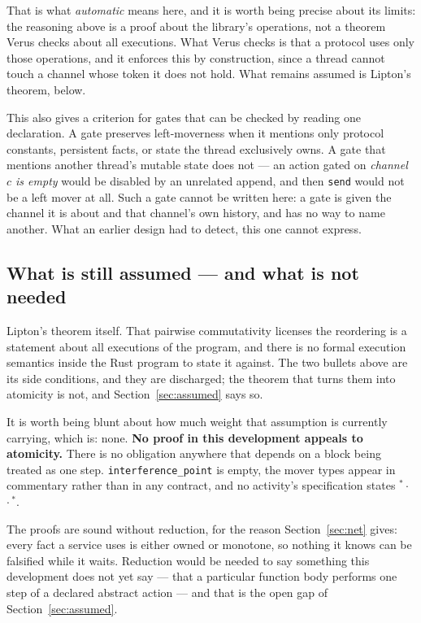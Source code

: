 \documentclass[11pt]{article}
\newcommand{\code}[1]{\texttt{#1}}
\newcommand{\chipR}[1]{\fcolorbox{rightmv}{white}{\color{rightmv}\ttfamily\scriptsize\vphantom{Ay}#1}}
\newcommand{\chipL}[1]{\fcolorbox{leftmv}{white}{\color{leftmv}\ttfamily\scriptsize\vphantom{Ay}#1}}
\newcommand{\chipN}[1]{\fcolorbox{neutralmv}{white}{\color{neutralmv}\ttfamily\scriptsize\vphantom{Ay}#1}}
\begin{document}
That is what \emph{automatic} means here, and it is worth being precise about
its limits: the reasoning above is a proof about the library's operations, not a
theorem Verus checks about all executions. What Verus checks is that a protocol
uses only those operations, and it enforces this by construction, since a thread
cannot touch a channel whose token it does not hold. What remains assumed is
Lipton's theorem, below.

This also gives a criterion for gates that can be checked by reading one
declaration. A gate preserves left-moverness when it mentions only protocol
constants, persistent facts, or state the thread exclusively owns. A gate that
mentions another thread's mutable state does not --- an action gated on
\emph{channel $c$ is empty} would be disabled by an unrelated append, and then
\code{send} would not be a left mover at all. Such a gate cannot be written
here: a gate is given the channel it is about and that channel's own history,
and has no way to name another. What an earlier design had to detect, this one
cannot express.

\subsection*{What is still assumed --- and what is not needed}

Lipton's theorem itself. That pairwise commutativity licenses the reordering is
a statement about all executions of the program, and there is no formal
execution semantics inside the Rust program to state it against. The two bullets
above are its side conditions, and they are discharged; the theorem that turns
them into atomicity is not, and Section~\ref{sec:assumed} says so.

It is worth being blunt about how much weight that assumption is currently
carrying, which is: none. \textbf{No proof in this development appeals to
atomicity.} There is no obligation anywhere that depends on a block being
treated as one step. \code{interference\_point} is empty, the mover types appear
in commentary rather than in any contract, and no activity's specification
states \chipR{R}$^*\cdot\,$\chipN{N}$\cdot\,$\chipL{L}$^*$.

The proofs are sound without reduction, for the reason Section~\ref{sec:net}
gives: every fact a service uses is either owned or monotone, so nothing it
knows can be falsified while it waits. Reduction would be needed to say
something this development does not yet say --- that a particular function body
performs one step of a declared abstract action --- and that is the open gap of
Section~\ref{sec:assumed}.
\end{document}

